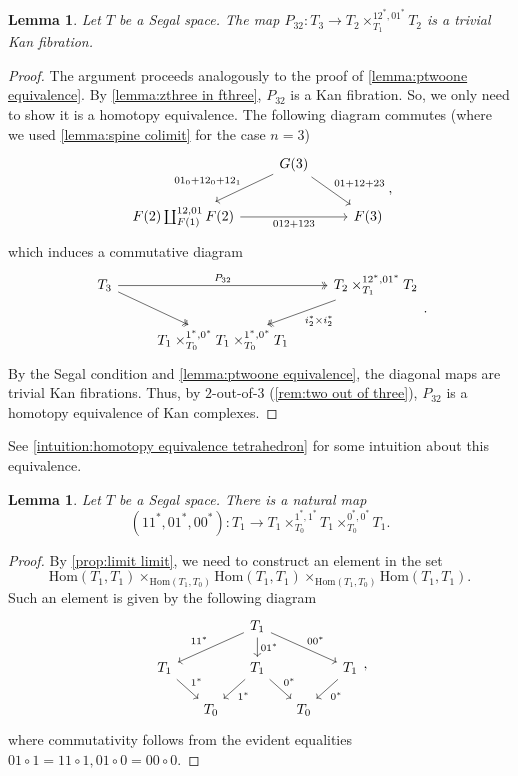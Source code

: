 \documentclass[11pt, a4paper]{amsart}
\newcommand{\Hom}{\mathrm{Hom}}
\newtheorem{lemma}[equation]{Lemma}
\theoremstyle{definition}
\theoremstyle{remark}
\numberwithin{equation}{section}
\begin{document}
\begin{lemma} \label{lemma:pthree equivalence}
 Let $T$ be a Segal space. The map $P_{32}\colon T_3 \to T_2 \times^{12^*,01^*}_{T_1} T_2$ is a trivial Kan fibration.
\end{lemma}

\begin{proof}
  The argument proceeds analogously to the proof of \cref{lemma:ptwoone equivalence}. By \cref{lemma:zthree in fthree}, $P_{32}$ is a Kan fibration. So, we only need to show it is a homotopy equivalence. The following diagram commutes (where we used \cref{lemma:spine colimit} for the case $n=3$)
 \[ 
 \begin{tikzcd}
  & G(3) \arrow[dl, "01_0 + 12_0 + 12_1"'] \arrow[dr, "01 + 12 + 23"] & \\
  F(2) \coprod_{F(1)}^{12,01} F(2) \arrow[rr, "012 + 123"'] & & F(3) 
 \end{tikzcd},
 \]
 which induces a commutative diagram
 \[
 \begin{tikzcd}
  T_3 \arrow[dr, twoheadrightarrow] \arrow[rr, "P_{32}", twoheadrightarrow] & & T_2 \times^{12^*,01^*}_{T_1} T_2  \arrow[dl, "i_2^* \times i_2^*", twoheadrightarrow] \\
  & T_1 \times^{1^*,0^*}_{T_0} T_1 \times^{1^*,0^*}_{T_0} T_1 & 
 \end{tikzcd}.
 \]
 By the Segal condition and \cref{lemma:ptwoone equivalence}, the diagonal maps are trivial Kan fibrations. Thus, by $2$-out-of-$3$  (\cref{rem:two out of three}), $P_{32}$ is a homotopy equivalence of Kan complexes.
\end{proof}

See \cref{intuition:homotopy equivalence tetrahedron} for some intuition about this equivalence.

\begin{lemma} \label{lemma:tetra to square}
  Let $T$ be a Segal space. There is a natural map
 \[ (11^* , 01^* , 00^*) \colon T_1 \to T_1 \times^{1^*,1^*}_{T_0} T_1 \times^{0^*,0^*}_{T_0} T_1.\]
\end{lemma}

\begin{proof}
  By \cref{prop:limit limit}, we need to construct an element in the set 
  \[\Hom(T_1,T_1) \times_{\Hom(T_1,T_0)} \Hom(T_1,T_1) \times_{\Hom(T_1,T_0)} \Hom(T_1,T_1).\] 
  Such an element is given by the following diagram
  \[ 
  \begin{tikzcd}[row sep=0.5cm, column sep=0.5cm]
      & & T_1 \arrow[dll, "11^*"'] \arrow[drr, "00^*"] \arrow[d, "01^*"] & \\
    T_1 \arrow[dr, "1^*"] & & T_1 \arrow[dl, "1^*"] \arrow[dr, "0^*"] & & T_1 \arrow[dl, "0^*"]\\
    & T_0  & & T_0 & 
  \end{tikzcd},
  \]
  where commutativity follows from the evident equalities $01 \circ 1 = 11 \circ 1, 01 \circ 0 = 00 \circ 0$.
\end{proof}
\end{document}
